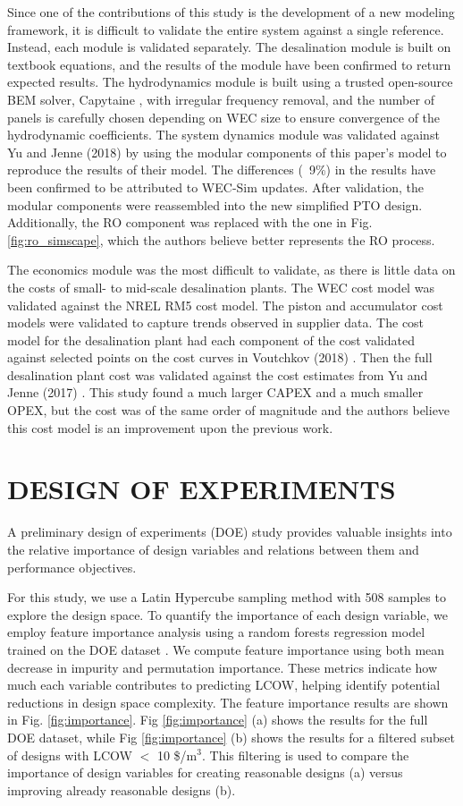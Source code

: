 \documentclass[twocolumn,10pt]{asme2e}
\begin{document}
Since one of the contributions of this study is the development of a new modeling framework, it is difficult to validate the entire system against a single reference. Instead, each module is validated separately. The desalination module is built on textbook equations, and the results of the module have been confirmed to return expected results. The hydrodynamics module is built using a trusted open-source BEM solver, Capytaine \cite{ancellin_capytaine_2019}, with irregular frequency removal, and the number of panels is carefully chosen depending on WEC size to ensure convergence of the hydrodynamic coefficients. The system dynamics module was validated against Yu and Jenne (2018) \cite{Yu2018} by using the modular components of this paper's model to reproduce the results of their model. The differences (~9\%) in the results have been confirmed to be attributed to WEC-Sim updates. After validation, the modular components were reassembled into the new simplified PTO design. Additionally, the RO component was replaced with the one in Fig. \ref{fig:ro_simscape}, which the authors believe better represents the RO process.

The economics module was the most difficult to validate, as there is little data on the costs of small- to mid-scale desalination plants. The WEC cost model was validated against the NREL RM5 \cite{rm5} cost model. The piston and accumulator cost models were validated to capture trends observed in supplier data. The cost model for the desalination plant had each component of the cost validated against selected points on the cost curves in Voutchkov (2018) \cite{voutch}. Then the full desalination plant cost was validated against the cost estimates from Yu and Jenne (2017) \cite{YJecon2017}. This study found a much larger CAPEX and a much smaller OPEX, but the cost was of the same order of magnitude and the authors believe this cost model is an improvement upon the previous work.

\section{DESIGN OF EXPERIMENTS}
A preliminary design of experiments (DOE) study provides valuable insights into the relative importance of design variables and relations between them and performance objectives.

For this study, we use a Latin Hypercube sampling method with 508 samples to explore the design space. To quantify the importance of each design variable, we employ feature importance analysis using a random forests regression model trained on the DOE dataset \cite{Rogers2006}. We compute feature importance using both mean decrease in impurity and permutation importance. These metrics indicate how much each variable contributes to predicting LCOW, helping identify potential reductions in design space complexity. The feature importance results are  shown in Fig. \ref{fig:importance}. Fig \ref{fig:importance} (a) shows the results for the full DOE dataset, while Fig \ref{fig:importance} (b) shows the results for a filtered subset of designs with LCOW $<$ 10 \$/m$^3$. This filtering is used to compare the importance of design variables for creating reasonable designs (a) versus improving already reasonable designs (b).
\end{document}
